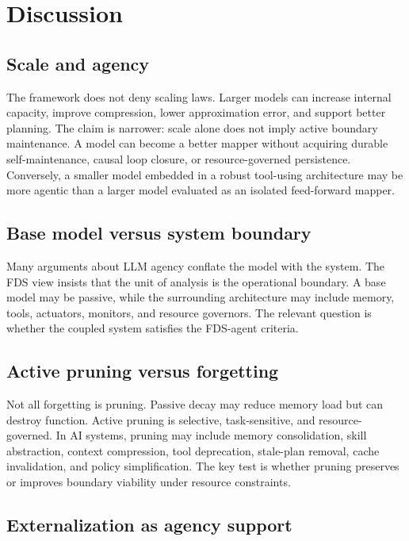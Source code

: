 \documentclass[10pt,a4paper,twocolumn,aps,prl]{revtex4-2}
\begin{document}
\section{Discussion}

\subsection{Scale and agency}

The framework does not deny scaling laws. Larger models can increase internal capacity, improve compression, lower approximation error, and support better planning. The claim is narrower: scale alone does not imply active boundary maintenance. A model can become a better mapper without acquiring durable self-maintenance, causal loop closure, or resource-governed persistence. Conversely, a smaller model embedded in a robust tool-using architecture may be more agentic than a larger model evaluated as an isolated feed-forward mapper.

\subsection{Base model versus system boundary}

Many arguments about LLM agency conflate the model with the system. The FDS view insists that the unit of analysis is the operational boundary. A base model may be passive, while the surrounding architecture may include memory, tools, actuators, monitors, and resource governors. The relevant question is whether the coupled system satisfies the FDS-agent criteria.

\subsection{Active pruning versus forgetting}

Not all forgetting is pruning. Passive decay may reduce memory load but can destroy function. Active pruning is selective, task-sensitive, and resource-governed. In AI systems, pruning may include memory consolidation, skill abstraction, context compression, tool deprecation, stale-plan removal, cache invalidation, and policy simplification. The key test is whether pruning preserves or improves boundary viability under resource constraints.

\subsection{Externalization as agency support}
\end{document}
